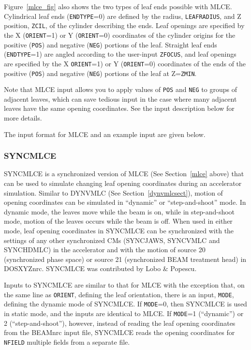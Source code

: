 \documentclass[12pt,twoside]{article}
\begin{document}
Figure~\ref{mlce_fig} also shows the two types of leaf ends possible with
MLCE.
Cylindrical leaf ends ({\tt ENDTYPE}=0) are defined by
the radius, {\tt LEAFRADIUS}, and Z position,
{\tt ZCIL}, of the cylinder describing the ends.
Leaf openings are specified by the
X ({\tt ORIENT}=1) or Y ({\tt ORIENT}=0)
coordinates of the cylinder origins for the positive
({\tt POS}) and negative ({\tt NEG}) portions of the leaf.
Straight leaf ends ({\tt ENDTYPE}=1) are angled according to
the user-input {\tt ZFOCUS}, and leaf openings are specified by the
X {\tt ORIENT}=1) or Y ({\tt ORIENT}=0)
coordinates of the ends of the positive ({\tt POS}) and
negative ({\tt NEG}) portions of the leaf at Z={\tt ZMIN}.

Note that MLCE input allows you to apply values of {\tt POS} and
{\tt NEG} to groups of adjacent leaves, which can save tedious input
in the case where many adjacent leaves have the same opening
coordinates.  See the input description below for more details.

The input format for MLCE and an example input are given below.
\begin{small}

\end{small}

\clearpage

\renewcommand{\rightmark}{SYNCMLCE CM}
\subsubsection{SYNCMLCE}

SYNCMLCE is a synchronized version of MLCE (See Section~\ref{mlce} above) that can be used to simulate
changing leaf opening coordinates during an accelerator simulation.  Similar to
DYNVMLC (See Section~\ref{dynvmlcsect}), motion of opening coordinates
can be simulated in ``dynamic'' or ``step-and-shoot'' mode.  In dynamic mode,
the leaves move while the beam is on, while in step-and-shoot mode, motion of
the leaves occurs while the beam is off.  When used in either mode, leaf
opening coordinates in SYNCMLCE can be synchronized with the settings of
any other synchronized CMs (SYNCJAWS, SYNCVMLC and SYNCHDMLC) in the accelerator
and with the motion of source 20 (synchronized phase space) or source 21
(synchronized BEAM treatment head) in DOSXYZnrc\cite{Wa05}.  SYNCMLCE was
contributed by Lobo \& Popescu\cite{LP10}.

Inputs to SYNCMLCE are similar to that for MLCE with the exception that,
on the same line as {\tt ORIENT}, defining the leaf orientation, there is
an input, {\tt MODE}, defining the dynamic mode of SYNCMLCE.  If
{\tt MODE}=0, then SYNCMLCE is used in static mode, and the inputs
are identical to MLCE.  If {\tt MODE}=1 (``dynamic'') or 2 (``step-and-shoot''), however,
instead of reading the leaf opening coordinates from the BEAMnrc input file, SYNCMLCE reads
the opening coordinates for {\tt NFIELD} multiple fields from a separate file.
\end{document}
